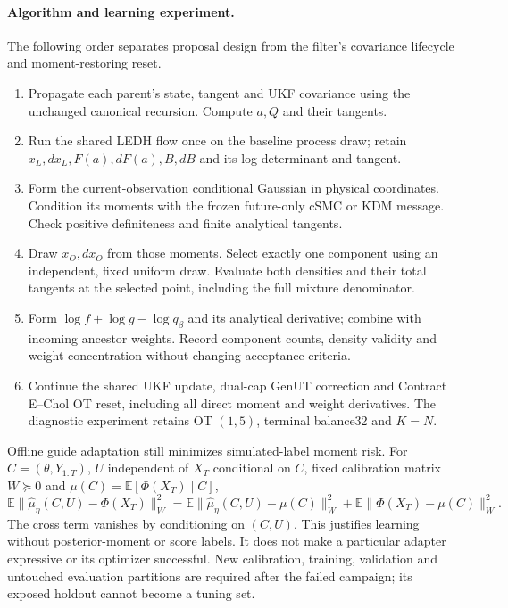\paragraph{Algorithm and learning experiment.}
The following order separates proposal design from the filter's covariance
lifecycle and moment-restoring reset.
\begin{enumerate}[leftmargin=*,label=\arabic*.]
\item Propagate each parent's state, tangent and UKF covariance using the
unchanged canonical recursion. Compute $a,Q$ and their tangents.
\item Run the shared LEDH flow once on the baseline process draw; retain
$x_L,dx_L,F(a),dF(a),B,dB$ and its log determinant and tangent.
\item Form the current-observation conditional Gaussian in physical
coordinates. Condition its moments with the frozen future-only cSMC or KDM
message. Check positive definiteness and finite analytical tangents.
\item Draw $x_O,dx_O$ from those moments. Select exactly one component using
an independent, fixed uniform draw. Evaluate both densities and their total
tangents at the selected point, including the full mixture denominator.
\item Form $\log f+\log g-\log q_\beta$ and its analytical derivative;
combine with incoming ancestor weights. Record component counts, density
validity and weight concentration without changing acceptance criteria.
\item Continue the shared UKF update, dual-cap GenUT correction and
Contract E--Chol OT reset, including all direct moment and weight derivatives.
The diagnostic experiment retains OT $(1,5)$, terminal balance32 and $K=N$.
\end{enumerate}

Offline guide adaptation still minimizes simulated-label moment risk. For
$C=(\theta,Y_{1:T})$, $U$ independent of $X_T$ conditional on $C$, fixed
calibration matrix $W\succeq0$ and $\mu(C)=\mathbb E[\Phi(X_T)\mid C]$,
\[
 \mathbb E\|\widehat\mu_\eta(C,U)-\Phi(X_T)\|_W^2
 =\mathbb E\|\widehat\mu_\eta(C,U)-\mu(C)\|_W^2
  +\mathbb E\|\Phi(X_T)-\mu(C)\|_W^2.
\]
The cross term vanishes by conditioning on $(C,U)$. This justifies learning
without posterior-moment or score labels. It does not make a particular
adapter expressive or its optimizer successful. New calibration, training,
validation and untouched evaluation partitions are required after the failed
campaign; its exposed holdout cannot become a tuning set.

